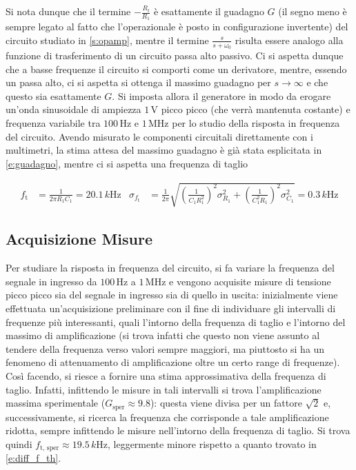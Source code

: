 \documentclass[a4paper,11pt]{article} %
\begin{document}
\noindent Si nota dunque che il termine $-\frac{R_{\text{f}}}{R_{1}}$ è esattamente il guadagno $G$ (il segno meno è
sempre legato al fatto che l'operazionale è posto in configurazione invertente) del circuito studiato in
\autoref{s:opamp}, mentre il termine $\frac{s}{s+\omega_{0}}$ risulta essere analogo alla funzione di trasferimento di
un circuito passa alto passivo. Ci si aspetta dunque che a basse frequenze il circuito si comporti come un derivatore,
mentre, essendo un passa alto, ci si aspetta si ottenga il massimo guadagno per $s\rightarrow\infty$ e che questo sia
esattamente $G$. Si imposta allora il generatore in modo da erogare un'onda sinusoidale di ampiezza $1\,\si{\volt}$
picco picco (che verrà mantenuta costante) e frequenza variabile tra $100\,\si{\Hz}$ e $1\,\si{\MHz}$ per lo studio
della risposta in frequenza del circuito. Avendo misurato le componenti circuitali direttamente con i multimetri, la
stima attesa del massimo guadagno è già stata esplicitata in \autoref{e:guadagno}, mentre ci si aspetta una frequenza di
taglio

\begin{align}\label{e:diff_f_th}
	f_{\text{t}}&=\frac{1}{2\pi R_{1}C_{1}}=20.1 \,\si{k\Hz} & \sigma_{f_{\text{t}}}&=\frac{1}{2\pi}\sqrt{	\left(\frac{1}{C_{1}R_{1}^2}\right)^2\sigma_{R_{1}}^2	+
																	\left(\frac{1}{C_{1}^2R_{1}}\right)^2\sigma_{C_{1}}^2   }
																	= 0.3 \,\si{k\Hz}	
\end{align}



\subsection{Acquisizione Misure}
Per studiare la risposta in frequenza del circuito, si fa variare la frequenza del segnale in ingresso da
$100\,\si{\Hz}$ a $1\,\si{\MHz}$ e vengono acquisite misure di tensione picco picco sia del segnale in ingresso sia di
quello in uscita: inizialmente viene effettuata un'acquisizione preliminare con il fine di individuare gli intervalli di
frequenze più interessanti, quali l'intorno della frequenza di taglio e l'intorno del massimo di amplificazione (si
trova infatti che questo non viene assunto al tendere della frequenza verso valori sempre maggiori, ma piuttosto si ha
un fenomeno di attenuamento di amplificazione oltre un certo range di frequenze). Così facendo, si riesce a fornire una
stima approssimativa della frequenza di taglio. Infatti, infittendo le misure in tali intervalli si trova
l'amplificazione massima sperimentale ($G_{\text{sper}}\approx 9.8$): questa viene divisa per un fattore $\sqrt{2}$ e,
successivamente, si ricerca la frequenza che corrisponde a tale amplificazione ridotta, sempre infittendo le misure
nell'intorno della frequenza di taglio. Si trova quindi $f_{\text{t, sper}}\approx 19.5\,\si{k\Hz}$, leggermente minore
rispetto a quanto trovato in \autoref{e:diff_f_th}.
\end{document}
